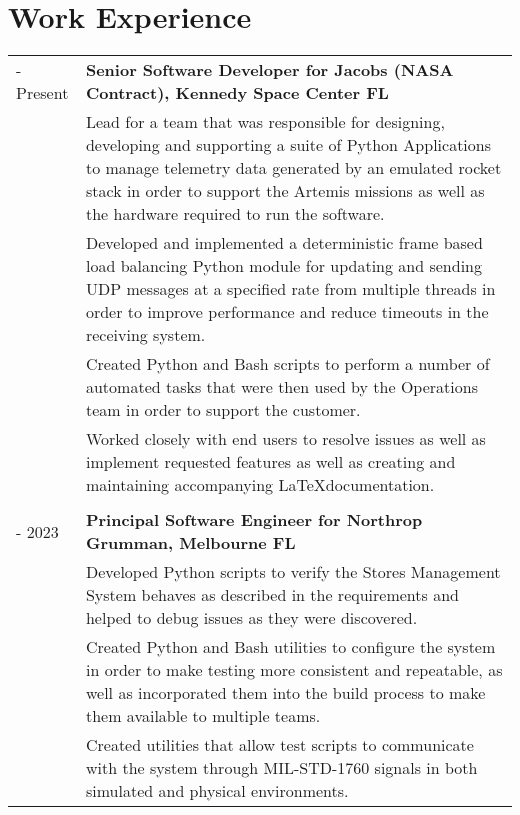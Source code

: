 \documentclass[11pt, letterpaper]{article}
\begin{document}
\section*{\selectfont Work Experience}
\vspace{-0.5cm}
\begin{longtable}{p{1in}|p{6in}}
    \centering 2023 - Present & \textbf{Senior Software Developer for Jacobs (NASA Contract), Kennedy Space Center FL}\\&
        Lead for a team that was responsible for designing, developing and supporting a suite of Python Applications to manage telemetry data generated by an emulated rocket stack in order to support the Artemis missions as well as the hardware required to run the software. \vspace{0.2cm}\\&
        Developed and implemented a deterministic frame based load balancing Python module for updating and sending UDP messages at a specified rate from multiple threads in order to improve performance and reduce timeouts in the receiving system.\vspace{0.2cm}\\&
        Created Python and Bash scripts to perform a number of automated tasks that were then used by the Operations team in order to support the customer.\vspace{0.2cm}\\&
        Worked closely with end users to resolve issues as well as implement requested features as well as creating and maintaining accompanying \LaTeX documentation.\\
	\multicolumn{2}{c}{}\\
    \centering 2019 - 2023 & \textbf{Principal Software Engineer for Northrop Grumman, Melbourne FL}\vspace{0.1cm}\\&
        Developed Python scripts to verify the Stores Management System behaves as described in the requirements and helped to debug issues as they were discovered.\vspace{0.2cm}\\&
        Created Python and Bash utilities to configure the system in order to make testing more consistent and repeatable, as well as incorporated them into the build process to make them available to multiple teams.\vspace{0.2cm}\\&
        Created utilities that allow test scripts to communicate with the system through MIL-STD-1760 signals in both simulated and physical environments.

\end{longtable}
\end{document}
